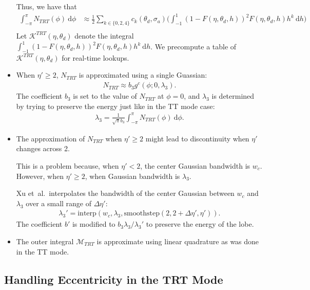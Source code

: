 \documentclass[10pt]{article}
\newcommand{\dee}{\mathrm{d}}
\newcommand{\mrm}[1]{\mathrm{#1}}
\newcommand{\etal}{{et~al.}}
\newcommand{\modeint}{\mathcal{M}}
\begin{document}
\begin{itemize}
    Thus, we have that
    \begin{align*}
      \int_{-\pi}^\pi N_{TRT}(\phi)\ \dee\phi
      &\approx \frac{1}{2}\sum_{k \in \{ 0, 2, 4\}} c_k(\theta_d, \sigma_a) \bigg( \int_{-1}^1 (1 - F(\eta, \theta_d, h))^2 F(\eta, \theta_d, h) h^k \ \dee h \bigg)\\      
    \end{align*}
    Let $\mathcal{K}^{TRT}(\eta, \theta_d)$ denote the integral $\int_{-1}^1 (1 - F(\eta, \theta_d, h))^2 F(\eta, \theta_d, h) h^k \ \dee h$. We precompute a table of $\mathcal{K}^{TRT}(\eta, \theta_d)$ for real-time lookups.
    
    \item When $\eta' \geq 2$, $N_{TRT}$ is approximated using a single Guassian:
    \begin{align*}
      N_{TRT} \approx b_3 g^c(\phi; 0, \lambda_3).
    \end{align*}
    The coefficient $b_3$ is set to the value of $N_{TRT}$ at $\phi = 0$, and $\lambda_3$ is determined by trying to preserve the energy just like in the TT mode case:
    \begin{align*}
      \lambda_3 = \frac{1}{\sqrt{\pi}b_3}\int_{-\pi}^\pi N_{TRT}(\phi)\ \dee\phi.
    \end{align*}
    
    \item The approximation of $N_{TRT}$ when $\eta' \geq 2$ might lead to discontinuity when $\eta'$ changes across 2.
    
    This is a problem because, when $\eta' < 2$, the center Gaussian bandwidth is $w_c$. However, when $\eta' \geq 2$, when Gaussian bandwidth is $\lambda_3$.
    
    Xu \etal~interpolates the bandwidth of the center Gaussian between $w_c$ and $\lambda_3$ over a small range of $\Delta \eta'$:
    \begin{align*}
      \lambda_3' = \mrm{interp}(w_c, \lambda_3, \mrm{smoothstep}(2, 2+\Delta\eta', \eta')).
    \end{align*}
    The coefficient $b'$ is modified to $b_3 \lambda_3 / \lambda_3'$ to preserve the energy of the lobe.
    
    \item The outer integral $\modeint_{TRT}$ is approximate using linear quadrature as was done in the TT mode.
    
  \end{itemize}
  
  \subsection{Handling Eccentricity in the TRT Mode}
  
\end{document}
